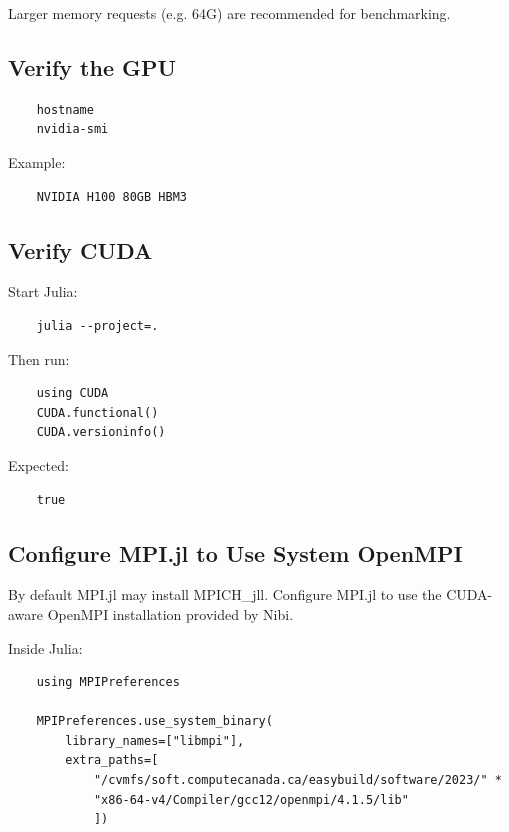 Larger memory requests (e.g. 64G) are recommended for benchmarking. 

\subsection{Verify the GPU} 

\begin{verbatim} 
    hostname 
    nvidia-smi 
\end{verbatim} 

Example: 

\begin{verbatim} 
    NVIDIA H100 80GB HBM3 
\end{verbatim} 

\subsection{Verify CUDA} 

Start Julia: 
\begin{verbatim} 
    julia --project=. 
\end{verbatim} 

Then run: 

\begin{verbatim} 
    using CUDA 
    CUDA.functional() 
    CUDA.versioninfo() 
\end{verbatim} 

Expected: 

\begin{verbatim} 
    true 
\end{verbatim} 

\subsection{Configure MPI.jl to Use System OpenMPI} 

By default MPI.jl may install MPICH\_jll. Configure MPI.jl to use the CUDA-aware OpenMPI installation provided by Nibi. 

Inside Julia: 

\begin{verbatim} 
    using MPIPreferences 
    
    MPIPreferences.use_system_binary( 
        library_names=["libmpi"], 
        extra_paths=[ 
            "/cvmfs/soft.computecanada.ca/easybuild/software/2023/" * 
            "x86-64-v4/Compiler/gcc12/openmpi/4.1.5/lib" 
            ]) 
\end{verbatim} 

